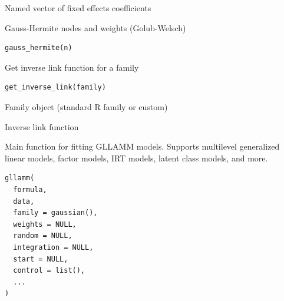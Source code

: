 \documentclass[a4paper]{book}
\begin{document}
%
\begin{Value}
Named vector of fixed effects coefficients
\end{Value}
%
\begin{Description}
Gauss-Hermite nodes and weights (Golub-Welsch)
\end{Description}
%
\begin{Usage}
\begin{verbatim}
gauss_hermite(n)
\end{verbatim}
\end{Usage}
%
\begin{Description}
Get inverse link function for a family
\end{Description}
%
\begin{Usage}
\begin{verbatim}
get_inverse_link(family)
\end{verbatim}
\end{Usage}
%
\begin{Arguments}
\begin{ldescription}
\item[\code{family}] Family object (standard R family or custom)
\end{ldescription}
\end{Arguments}
%
\begin{Value}
Inverse link function
\end{Value}
%
\begin{Description}
Main function for fitting GLLAMM models. Supports multilevel generalized
linear models, factor models, IRT models, latent class models, and more.
\end{Description}
%
\begin{Usage}
\begin{verbatim}
gllamm(
  formula,
  data,
  family = gaussian(),
  weights = NULL,
  random = NULL,
  integration = NULL,
  start = NULL,
  control = list(),
  ...
)
\end{verbatim}
\end{Usage}
%
\end{document}
